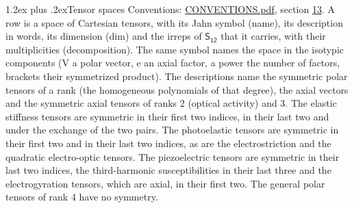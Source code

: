 \documentclass[10pt,a4paper]{article}
\makeatletter
\renewcommand\section{\@startsection{section}{1}{\z@}{-3ex plus -1ex minus -.2ex}%
  {1.2ex plus .2ex}{\normalfont\large\sffamily\bfseries\color{parttitle}}}
\numberwithin{equation}{section}
\newcommand{\grp}[1]{\mathsf{#1}}
\makeatother
\begin{document}
\section{Tensor spaces}\label{s:tensor_spaces}
Conventions: \href{../../CONVENTIONS.pdf}{CONVENTIONS.pdf}, section \href{../../CONVENTIONS.pdf\#conv.13}{13}.
\leavevmode\label{n:head.name}\label{n:head.description}\label{n:head.dim}\label{n:head.decomposition}A row is a space of Cartesian tensors, with its Jahn symbol (name), its description in words, its dimension (dim) and the irreps of $\grp{S_{12}}$ that it carries, with their multiplicities (decomposition). \label{n:label.jahn}The same symbol names the space in the isotypic components (V a polar vector, e an axial factor, a power the number of factors, brackets their symmetrized product). The descriptions name the symmetric polar tensors of a rank (the homogeneous polynomials of that degree), the axial vectors and the symmetric axial tensors of ranks 2 (optical activity) and 3. The elastic stiffness tensors are symmetric in their first two indices, in their last two and under the exchange of the two pairs. The photoelastic tensors are symmetric in their first two and in their last two indices, as are the electrostriction and the quadratic electro-optic tensors. The piezoelectric tensors are symmetric in their last two indices, the third-harmonic susceptibilities in their last three and the electrogyration tensors, which are axial, in their first two. The general polar tensors of rank 4 have no symmetry.
\end{document}
